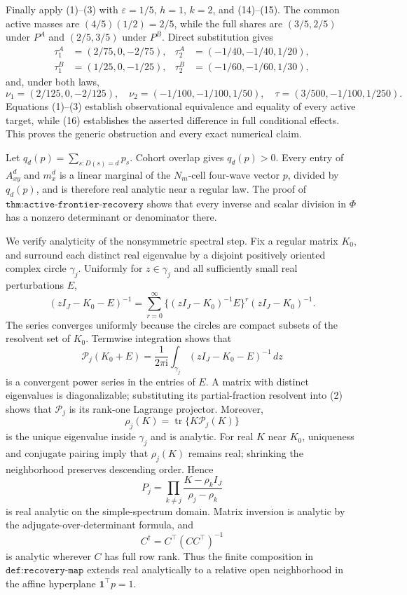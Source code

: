 Finally apply (1)--(3) with \(\varepsilon=1/5\), \(h=1\), \(k=2\), and (14)--(15).  The common active masses are \((4/5)(1/2)=2/5\), while the full shares are \((3/5,2/5)\) under \(P^A\) and \((2/5,3/5)\) under \(P^B\).  Direct substitution gives
\[
\begin{aligned}
 \tau_1^A&=(2/75,0,-2/75),&
 \tau_2^A&=(-1/40,-1/40,1/20),\\
 \tau_1^B&=(1/25,0,-1/25),&
 \tau_2^B&=(-1/60,-1/60,1/30),
\end{aligned}
\tag{16}
\]
and, under both laws,
\[
 \nu_1=(2/125,0,-2/125),\quad
 \nu_2=(-1/100,-1/100,1/50),\quad
 \tau=(3/500,-1/100,1/250).
\tag{17}
\]
Equations (1)--(3) establish observational equivalence and equality of every active target, while (16) establishes the asserted difference in full conditional effects.  This proves the generic obstruction and every exact numerical claim.

Let \(q_d(p)=\sum_{s:D(s)=d}p_s\).  Cohort overlap gives \(q_d(p)>0\).  Every entry of \(A_{xy}^d\) and \(m_x^d\) is a linear marginal of the \(N_m\)-cell four-wave vector \(p\), divided by \(q_d(p)\), and is therefore real analytic near a regular law.  The proof of \(\texttt{thm:active-frontier-recovery}\) shows that every inverse and scalar division in \(\Phi\) has a nonzero determinant or denominator there.

We verify analyticity of the nonsymmetric spectral step.  Fix a regular matrix \(K_0\), and surround each distinct real eigenvalue by a disjoint positively oriented complex circle \(\gamma_j\).  Uniformly for \(z\in\gamma_j\) and all sufficiently small real perturbations \(E\),
\[
 (zI_J-K_0-E)^{-1}
 =\sum_{r=0}^{\infty}\{(zI_J-K_0)^{-1}E\}^r(zI_J-K_0)^{-1}.
\tag{1}
\]
The series converges uniformly because the circles are compact subsets of the resolvent set of \(K_0\).  Termwise integration shows that
\[
 \mathcal P_j(K_0+E)=\frac{1}{2\pi\mathrm i}
 \int_{\gamma_j}(zI_J-K_0-E)^{-1}\,dz
\tag{2}
\]
is a convergent power series in the entries of \(E\).  A matrix with distinct eigenvalues is diagonalizable; substituting its partial-fraction resolvent into (2) shows that \(\mathcal P_j\) is its rank-one Lagrange projector.  Moreover,
\[
 \rho_j(K)=\operatorname{tr}\{K\mathcal P_j(K)\}
\tag{3}
\]
is the unique eigenvalue inside \(\gamma_j\) and is analytic.  For real \(K\) near \(K_0\), uniqueness and conjugate pairing imply that \(\rho_j(K)\) remains real; shrinking the neighborhood preserves descending order.  Hence
\[
 P_j=\prod_{k\ne j}\frac{K-\rho_kI_J}{\rho_j-\rho_k}
\tag{4}
\]
is real analytic on the simple-spectrum domain.  Matrix inversion is analytic by the adjugate-over-determinant formula, and
\[
 C^\dagger=C^\top(CC^\top)^{-1}
\tag{5}
\]
is analytic wherever \(C\) has full row rank.  Thus the finite composition in \(\texttt{def:recovery-map}\) extends real analytically to a relative open neighborhood in the affine hyperplane \(\mathbf1^\top p=1\).

